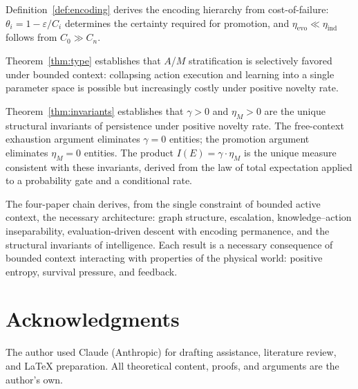 \documentclass[11pt]{article}
\theoremstyle{definition}
\theoremstyle{remark}
\begin{document}
Definition~\ref{def:encoding} derives the encoding hierarchy from
cost-of-failure: $\theta_i = 1 - \varepsilon / C_i$ determines the
certainty required for promotion, and $\eta_{\mathrm{evo}} \ll
\eta_{\mathrm{ind}}$ follows from $C_0 \gg C_n$.

Theorem~\ref{thm:type} establishes that $A$/$M$ stratification is
selectively favored under bounded context: collapsing action execution
and learning into a single parameter space is possible but increasingly
costly under positive novelty rate.

Theorem~\ref{thm:invariants} establishes that $\gamma > 0$ and
$\eta_M > 0$ are the unique structural invariants of persistence under
positive novelty rate. The free-context exhaustion argument eliminates
$\gamma = 0$ entities; the promotion argument eliminates $\eta_M = 0$
entities. The product $I(E) = \gamma \cdot \eta_M$ is the unique measure
consistent with these invariants, derived from the law of total
expectation applied to a probability gate and a conditional rate.

The four-paper chain derives, from the single constraint of bounded
active context, the necessary architecture: graph structure,
escalation, knowledge--action inseparability, evaluation-driven descent
with encoding permanence, and the structural invariants of intelligence.
Each result is a necessary consequence of bounded context interacting
with properties of the physical world: positive entropy, survival
pressure, and feedback.

\section*{Acknowledgments}

The author used Claude (Anthropic) for drafting assistance, literature review, and \LaTeX{} preparation. All theoretical content, proofs, and arguments are the author's own.
\end{document}
